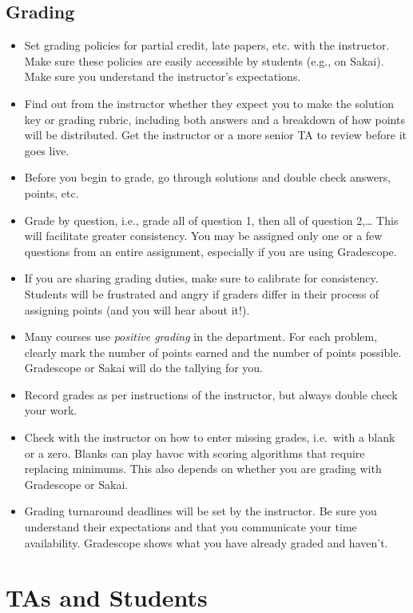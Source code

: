 \documentclass[
]{article}
\begin{document}
\hypertarget{grading}{%
\subsection{Grading}\label{grading}}

\begin{itemize}
\item
  Set grading policies for partial credit, late papers, etc. with the instructor. Make sure these policies are easily accessible by students (e.g., on Sakai). Make sure you understand the instructor's expectations.
\item
  Find out from the instructor whether they expect you to make the solution key or grading rubric, including both answers and a breakdown of how points will be distributed. Get the instructor or a more senior TA to review before it goes live.
\item
  Before you begin to grade, go through solutions and double check answers, points, etc.
\item
  Grade by question, i.e., grade all of question 1, then all of question 2,\ldots{} This will facilitate greater consistency. You may be assigned only one or a few questions from an entire assignment, especially if you are using Gradescope.
\item
  If you are sharing grading duties, make sure to calibrate for consistency. Students will be frustrated and angry if graders differ in their process of assigning points (and you will hear about it!).
\item
  Many courses use \emph{positive grading} in the department. For each problem, clearly mark the number of points earned and the number of points possible. Gradescope or Sakai will do the tallying for you.
\item
  Record grades as per instructions of the instructor, but always double check your work.
\item
  Check with the instructor on how to enter missing grades, i.e.~with a blank or a zero. Blanks can play havoc with scoring algorithms that require replacing minimums. This also depends on whether you are grading with Gradescope or Sakai.
\item
  Grading turnaround deadlines will be set by the instructor. Be sure you understand their expectations and that you communicate your time availability. Gradescope shows what you have already graded and haven't.
\end{itemize}

\hypertarget{tas-and-students}{%
\section{TAs and Students}\label{tas-and-students}}
\end{document}
